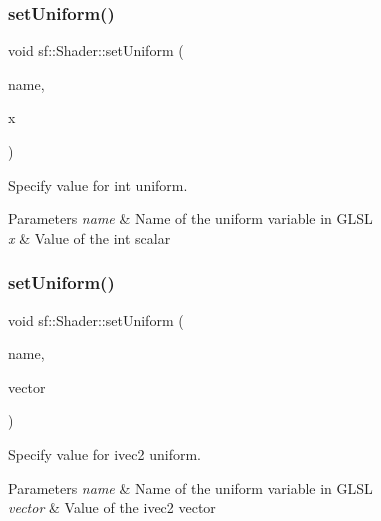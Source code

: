 \subsubsection{\texorpdfstring{set\+Uniform()}{setUniform()}\hspace{0.1cm}{\footnotesize\ttfamily [5/16]}}
{\footnotesize\ttfamily void sf\+::\+Shader\+::set\+Uniform (\begin{DoxyParamCaption}\item[{const std\+::string \&}]{name,  }\item[{int}]{x }\end{DoxyParamCaption})}



Specify value for {\ttfamily int} uniform. 


\begin{DoxyParams}{Parameters}
{\em name} & Name of the uniform variable in G\+L\+SL \\
\hline
{\em x} & Value of the int scalar \\
\hline
\end{DoxyParams}
\mbox{\label{classsf_1_1_shader_a2ccb5bae59cedc7d6a9b533c97f7d1ed}} 
\subsubsection{\texorpdfstring{set\+Uniform()}{setUniform()}\hspace{0.1cm}{\footnotesize\ttfamily [6/16]}}
{\footnotesize\ttfamily void sf\+::\+Shader\+::set\+Uniform (\begin{DoxyParamCaption}\item[{const std\+::string \&}]{name,  }\item[{const \hyperlink{namespacesf_1_1_glsl_aab803ee70c4b7bfcd63ec09e10408fd3}{Glsl\+::\+Ivec2} \&}]{vector }\end{DoxyParamCaption})}



Specify value for {\ttfamily ivec2} uniform. 


\begin{DoxyParams}{Parameters}
{\em name} & Name of the uniform variable in G\+L\+SL \\
\hline
{\em vector} & Value of the ivec2 vector \\
\hline
\end{DoxyParams}
\mbox{\label{classsf_1_1_shader_a9e328e3e97cd753fdc7b842f4b0f202e}} 
